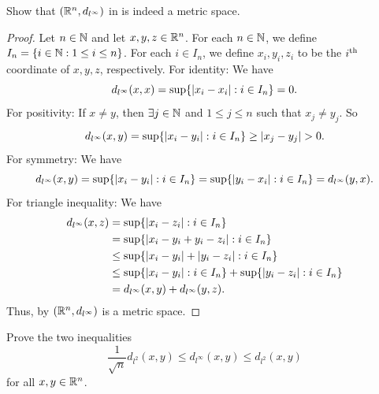 \begin{ex}\label{ii:ex:1.1.9}
  Show that \((\mathbb{R}^n, d_{l^\infty})\) in  is indeed a metric space.
\end{ex}

\begin{proof}
  Let \(n \in \mathbb{N}\) and let \(x, y, z \in \mathbb{R}^n\).
  For each \(n \in \mathbb{N}\), we define \(I_n = \left\lbrace i \in \mathbb{N} : 1 \leq i \leq n\right\rbrace\).
  For each \(i \in I_n\), we define \(x_i, y_i, z_i\) to be the \(i^{\operatorname{th}}\) coordinate of \(x, y, z\), respectively.
  For identity:
  We have
  \[
    d_{l^\infty}(x, x) = \sup \set{\abs{x_i - x_i} : i \in I_n} = 0.
  \]
  For positivity:
  If \(x \neq y\), then \(\exists j \in \mathbb{N}\) and \(1 \leq j \leq n\) such that \(x_j \neq y_j\).
  So
  \[
    d_{l^\infty}(x, y) = \sup \set{\abs{x_i - y_i} : i \in I_n} \geq \abs{x_j - y_j} > 0.
  \]
  For symmetry:
  We have
  \[
    d_{l^\infty}(x, y) = \sup \set{\abs{x_i - y_i} : i \in I_n} = \sup \set{\abs{y_i - x_i} : i \in I_n} = d_{l^\infty}(y, x).
  \]
  For triangle inequality:
  We have
  \begin{align*}
    d_{l^\infty}(x, z) & = \sup \set{\abs{x_i - z_i} : i \in I_n}                                             \\
                       & = \sup \set{\abs{x_i - y_i + y_i - z_i} : i \in I_n}                                 \\
                       & \leq \sup \set{\abs{x_i - y_i} + \abs{y_i - z_i} : i \in I_n}                        \\
                       & \leq \sup \set{\abs{x_i - y_i} : i \in I_n} + \sup \set{\abs{y_i - z_i} : i \in I_n} \\
                       & = d_{l^\infty}(x, y) + d_{l^\infty}(y, z).
  \end{align*}
  Thus, by  \((\mathbb{R}^n, d_{l^\infty})\) is a metric space.
\end{proof}

\begin{ex}\label{ii:ex:1.1.10}
  Prove the two inequalities
  \[
    \dfrac{1}{\sqrt{n}} d_{l^2}(x, y) \leq d_{l^\infty}(x, y) \leq d_{l^2}(x, y)
  \]
  for all \(x, y \in \mathbb{R}^n\).
\end{ex}

